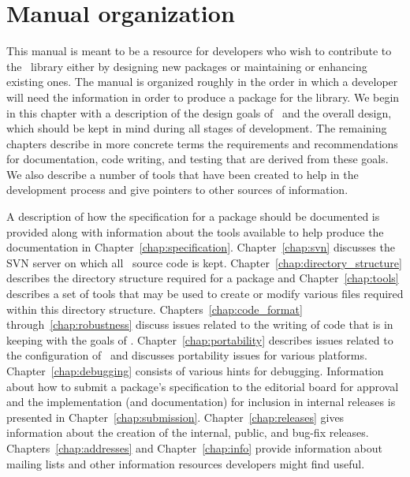 \section{Manual organization\label{sec:manual_org}}

This manual is meant to be a resource for developers who wish to contribute
to the \cgal\ library either by designing new packages or maintaining
or enhancing existing ones. The manual is organized roughly in the order in
which a developer will need the information in order to produce a package
for the library. We begin in this chapter with a description
of the design goals of \cgal\ and the overall design, which should be kept
in mind during all stages of development.  The remaining chapters describe
in more concrete terms the requirements and recommendations for documentation,
code writing, and testing that are derived from these goals.  We also describe
a number of tools that have been created to help in the development process
and give pointers to other sources of information.

A description of how the specification
for a package should be documented is provided along with information about
the tools available to help produce the documentation
in Chapter~\ref{chap:specification}.
Chapter~\ref{chap:svn} discusses the SVN server on which all \cgal\ source
code is kept.
Chapter~\ref{chap:directory_structure} describes the directory structure
required for a package and Chapter~\ref{chap:tools} describes a set of tools
that may be used to create or modify various files required within this
directory structure. Chapters~\ref{chap:code_format}
through~\ref{chap:robustness}
discuss issues related to the writing of code that is in keeping with
the goals of \cgal.  Chapter~\ref{chap:portability} describes issues
related to the configuration of \cgal\ and
discusses portability issues for various platforms. 
Chapter~\ref{chap:debugging} consists of various hints for debugging.
Information
about how to submit a package's specification to the editorial board
for approval and the implementation (and documentation) for inclusion in
internal releases is presented in  Chapter~\ref{chap:submission}.
Chapter~\ref{chap:releases} gives information about the creation of the
internal, public, and bug-fix releases.
Chapters~\ref{chap:addresses} and Chapter~\ref{chap:info}
provide information about mailing lists and other information
resources developers might find useful.
